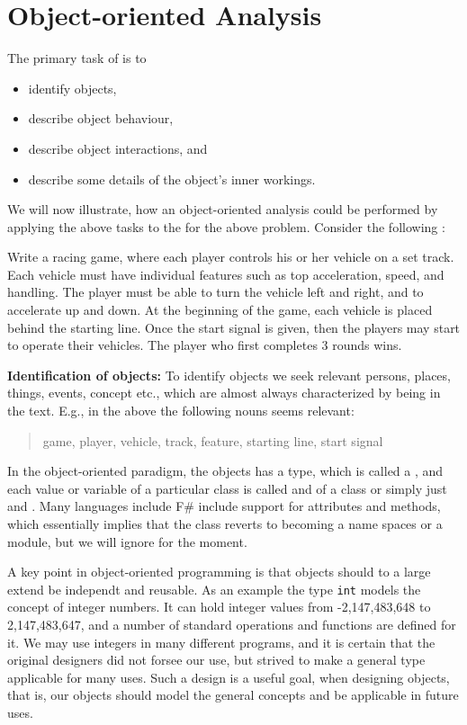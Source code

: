 \section{Object-oriented Analysis}
The primary task of  is to 
\begin{itemize}
\item identify objects,
\item describe object behaviour,
\item describe object interactions, and 
\item describe some details of the object's inner workings.
\end{itemize}
We will now illustrate, how an object-oriented analysis could be performed by applying the above tasks to the for the above problem. Consider the following :
%
\begin{problem}
  Write a racing game, where each player controls his or her vehicle on a set track. Each vehicle must have individual features such as top acceleration, speed, and handling. The player must be able to turn the vehicle left and right, and to accelerate up and down. At the beginning of the game, each vehicle is placed behind the starting line. Once the start signal is given, then the players may start to operate their vehicles. The player who first completes 3 rounds wins.
\end{problem}
%
\textbf{Identification of objects:} To identify objects we seek relevant persons, places, things, events, concept etc., which are almost always characterized by being  in the text. E.g., in the above the following nouns seems relevant: 
\begin{quote}
  game, player, vehicle, track, feature, starting line, start signal
\end{quote}
In the object-oriented paradigm, the objects has a type, which is called a , and each value or variable of a particular class is called and  of a class or simply just and . Many languages include F\# include support for  attributes and methods, which essentially implies that the class reverts to becoming a name spaces or a module, but we will ignore for the moment. 

A key point in object-oriented programming is that objects should to a large extend be independt and reusable. As an example the type \lstinline|int| models the concept of integer numbers. It can hold integer values from -2,147,483,648 to 2,147,483,647, and a number of standard operations and functions are defined for it. We may use integers in many different programs, and it is certain that the original designers did not forsee our use, but strived to make a general type applicable for many uses. Such a design is a useful goal, when designing objects, that is, our objects should model the general concepts and be applicable in future uses.

